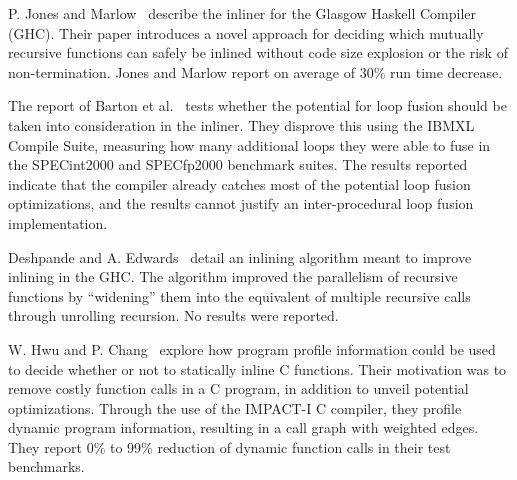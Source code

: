 P. Jones and Marlow~\cite{GHCPaper} describe the inliner for the Glasgow Haskell
Compiler (GHC). Their paper introduces a novel approach for deciding which
mutually recursive functions can safely be inlined without code size explosion
or the risk of non-termination. Jones and Marlow report on average of 30\% run
time decrease.

The report of Barton et al.~\cite{ShouldLoopOptsInfluenceInlining} tests whether
the potential for loop fusion should be taken into consideration in the inliner.
They disprove this using the IBM\textregistered XL Compile Suite, measuring how
many additional loops they were able to fuse in the SPECint2000 and SPECfp2000
benchmark suites. The results reported indicate that the compiler already
catches most of the potential loop fusion optimizations, and the results cannot
justify an inter-procedural loop fusion implementation.

Deshpande and A. Edwards~\cite{deshpande2012statically} detail an inlining
algorithm meant to improve inlining in the GHC. The algorithm improved the
parallelism of recursive functions by ``widening'' them into the equivalent of
multiple recursive calls through unrolling recursion. No results were reported.

W. Hwu and P. Chang~\cite{InlineFuncExpCProgs} explore how program profile
information could be used to decide whether or not to statically inline C
functions. Their motivation was to remove costly function calls in a C program,
in addition to unveil potential optimizations. Through the use of the IMPACT-I C
compiler, they profile dynamic program information, resulting in a call graph
with weighted edges. They report 0\% to 99\% reduction of dynamic function calls
in their test benchmarks.
